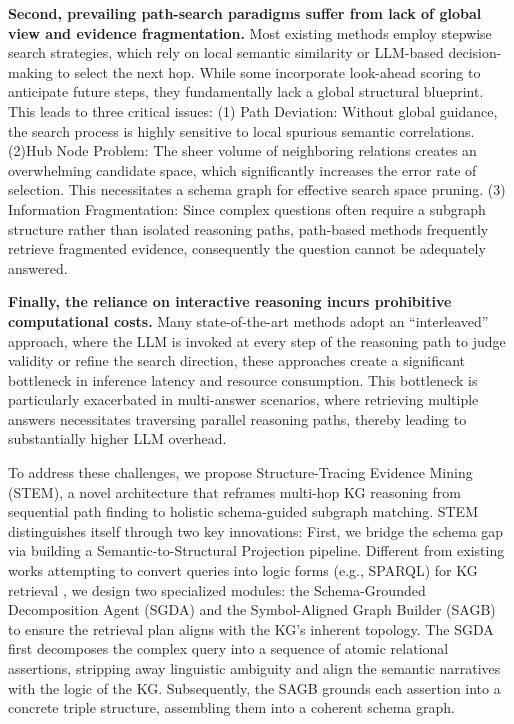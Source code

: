 \documentclass[11pt]{article}
\begin{document}
\textbf{Second, prevailing path-search paradigms suffer from lack of global view and evidence fragmentation.} Most existing methods employ stepwise search strategies, which rely on local semantic similarity or LLM-based decision-making to select the next hop. While some incorporate look-ahead scoring to anticipate future steps, they fundamentally lack a global structural blueprint. This leads to three critical issues: (1) Path Deviation: Without global guidance, the search process is highly sensitive to local spurious semantic correlations. (2)Hub Node Problem: The sheer volume of neighboring relations creates an overwhelming candidate space, which significantly increases the error rate of selection. This necessitates a schema graph for effective search space pruning. (3) Information Fragmentation: Since complex questions often require a subgraph structure rather than isolated reasoning paths, path-based methods frequently retrieve fragmented evidence, consequently the question cannot be adequately answered.

\textbf{Finally, the reliance on interactive reasoning incurs prohibitive computational costs.} Many state-of-the-art methods adopt an ``interleaved'' approach, where the LLM is invoked at every step of the reasoning path to judge validity or refine the search direction, these approaches create a significant bottleneck in inference latency and resource consumption. This bottleneck is particularly exacerbated in multi-answer scenarios, where retrieving multiple answers necessitates traversing parallel reasoning paths, thereby leading to substantially higher LLM overhead. 

To address these challenges, we propose Structure-Tracing Evidence Mining (STEM), a novel architecture that reframes multi-hop KG reasoning from sequential path finding to holistic schema-guided subgraph matching. STEM distinguishes itself through two key innovations: First, we bridge the schema gap via building a Semantic-to-Structural Projection pipeline. Different from existing works attempting to convert queries into logic forms (e.g., SPARQL) for KG retrieval \cite{sun2020sparqa,lan2020query,ye2022rng}, we design two specialized modules: the Schema-Grounded Decomposition Agent (SGDA) and the Symbol-Aligned Graph Builder (SAGB) to ensure the retrieval plan aligns with the KG's inherent topology. The SGDA first decomposes the complex query into a sequence of atomic relational assertions, stripping away linguistic ambiguity and align the semantic narratives with the logic of the KG. Subsequently, the SAGB grounds each assertion into a concrete triple structure, assembling them into a coherent schema graph. 
\end{document}
